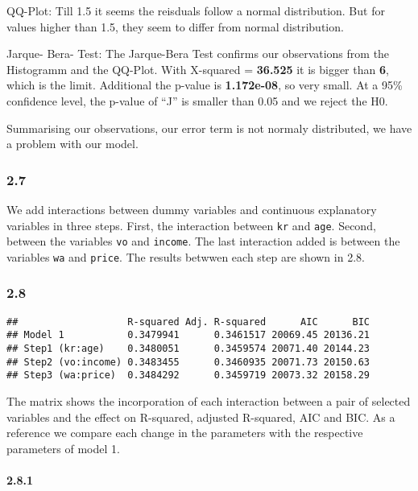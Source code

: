 \documentclass[
]{article}
\begin{document}
QQ-Plot: Till 1.5 it seems the reisduals follow a normal distribution.
But for values higher than 1.5, they seem to differ from normal
distribution.

Jarque- Bera- Test: The Jarque-Bera Test confirms our observations from
the Histogramm and the QQ-Plot. With X-squared = \textbf{36.525} it is
bigger than \textbf{6}, which is the limit. Additional the p-value is
\textbf{1.172e-08}, so very small. At a 95\% confidence level, the
p-value of ``J'' is smaller than 0.05 and we reject the H0.

Summarising our observations, our error term is not normaly distributed,
we have a problem with our model.

\hypertarget{section-7}{%
\subsubsection{2.7}\label{section-7}}

We add interactions between dummy variables and continuous explanatory
variables in three steps. First, the interaction between \texttt{kr} and
\texttt{age}. Second, between the variables \texttt{vo} and
\texttt{income}. The last interaction added is between the variables
\texttt{wa} and \texttt{price}. The results betwwen each step are shown
in 2.8.

\hypertarget{section-8}{%
\subsubsection{2.8}\label{section-8}}

\begin{verbatim}
##                   R-squared Adj. R-squared      AIC      BIC
## Model 1           0.3479941      0.3461517 20069.45 20136.21
## Step1 (kr:age)    0.3480051      0.3459574 20071.40 20144.23
## Step2 (vo:income) 0.3483455      0.3460935 20071.73 20150.63
## Step3 (wa:price)  0.3484292      0.3459719 20073.32 20158.29
\end{verbatim}

The matrix shows the incorporation of each interaction between a pair of
selected variables and the effect on R-squared, adjusted R-squared, AIC
and BIC. As a reference we compare each change in the parameters with
the respective parameters of model 1.

\hypertarget{section-9}{%
\paragraph{2.8.1}\label{section-9}}
\end{document}
